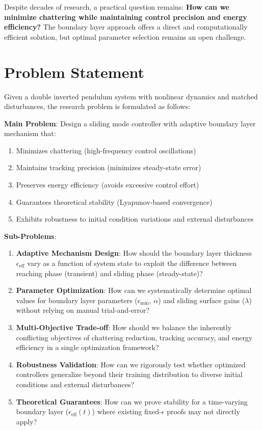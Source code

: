 Despite decades of research, a practical question remains: \textbf{How can we minimize chattering while maintaining control precision and energy efficiency?} The boundary layer approach offers a direct and computationally efficient solution, but optimal parameter selection remains an open challenge.

\section{Problem Statement}
\label{sec:problem_statement}

Given a double inverted pendulum system with nonlinear dynamics and matched disturbances, the research problem is formulated as follows:

\textbf{Main Problem}: Design a sliding mode controller with adaptive boundary layer mechanism that:
\begin{enumerate}
    \item Minimizes chattering (high-frequency control oscillations)
    \item Maintains tracking precision (minimizes steady-state error)
    \item Preserves energy efficiency (avoids excessive control effort)
    \item Guarantees theoretical stability (Lyapunov-based convergence)
    \item Exhibits robustness to initial condition variations and external disturbances
\end{enumerate}

\textbf{Sub-Problems}:
\begin{enumerate}
    \item \textbf{Adaptive Mechanism Design}: How should the boundary layer thickness $\epsilon_{\text{eff}}$ vary as a function of system state to exploit the difference between reaching phase (transient) and sliding phase (steady-state)?

    \item \textbf{Parameter Optimization}: How can we systematically determine optimal values for boundary layer parameters ($\epsilon_{\min}$, $\alpha$) and sliding surface gains ($\lambda$) without relying on manual trial-and-error?

    \item \textbf{Multi-Objective Trade-off}: How should we balance the inherently conflicting objectives of chattering reduction, tracking accuracy, and energy efficiency in a single optimization framework?

    \item \textbf{Robustness Validation}: How can we rigorously test whether optimized controllers generalize beyond their training distribution to diverse initial conditions and external disturbances?

    \item \textbf{Theoretical Guarantees}: How can we prove stability for a time-varying boundary layer ($\epsilon_{\text{eff}}(t)$) where existing fixed-$\epsilon$ proofs may not directly apply?
\end{enumerate}

